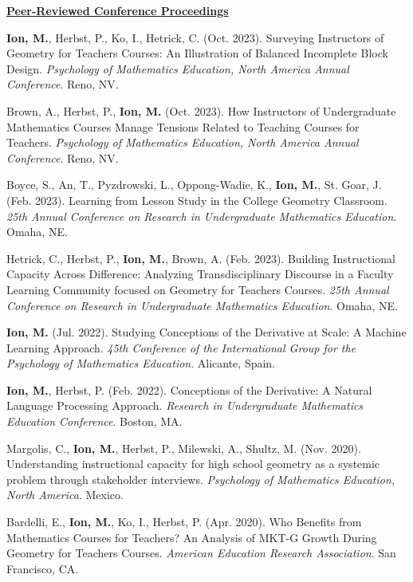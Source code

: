 \documentclass[margin,line]{res}
\newenvironment{list3}{
        \begin{list}{\ding{113}}{%
            \setlength{\itemsep}{0in}
            \setlength{\parsep}{0in} \setlength{\parskip}{0in}
            \setlength{\topsep}{0in} \setlength{\partopsep}{0in}
            \setlength{\leftmargin}{0in}
            \setlength{\rightmargin}{1.25in}}}{\end{list}}
\renewcommand{\subsection}[1]{%
      \par\vspace{3pt}%
      \underline{\normalsize\bfseries #1}%
      \par\vspace{3pt}%
    }
\begin{document}
\begin{resume}
\subsection{\sc Peer-Reviewed Conference Proceedings} 
\begin{list3} 
  \item \textbf{Ion, M.}, Herbst, P., Ko, I., Hetrick, C. (Oct. 2023). Surveying Instructors of Geometry for Teachers Courses: An Illustration of Balanced Incomplete Block Design. \textit{Psychology of Mathematics Education, North America Annual Conference}. Reno, NV. 
  \item Brown, A., Herbst, P., \textbf{Ion, M.} (Oct. 2023). How Instructors of Undergraduate Mathematics Courses Manage Tensions Related to Teaching Courses for Teachers. \textit{Psychology of Mathematics Education, North America Annual Conference}. Reno, NV. 
  \item Boyce, S., An, T., Pyzdrowski, L., Oppong-Wadie, K., \textbf{Ion, M.}, St. Goar, J. (Feb. 2023). Learning from Lesson Study in the College Geometry Classroom. \textit{25th Annual Conference on Research in Undergraduate Mathematics Education}. Omaha, NE.
  \item Hetrick, C., Herbst, P., \textbf{Ion, M.}, Brown, A. (Feb. 2023). Building Instructional Capacity Across Difference: Analyzing Transdisciplinary Discourse in a Faculty Learning Community focused on Geometry for Teachers Courses. \textit{25th Annual Conference on Research in Undergraduate Mathematics Education}. Omaha, NE.
  \item \textbf{Ion, M.} (Jul. 2022). Studying Conceptions of the Derivative at Scale: A Machine Learning Approach. \textit{45th Conference of the International Group for the Psychology of Mathematics Education}. Alicante, Spain. 
  \item \textbf{Ion, M.}, Herbst, P. (Feb. 2022). Conceptions of the Derivative: A Natural Language Processing Approach. \textit{Research in Undergraduate Mathematics Education Conference}. Boston, MA. 
  \item Margolis, C., \textbf{Ion, M.}, Herbst, P., Milewski, A., Shultz, M. (Nov. 2020). Understanding instructional capacity for high school geometry as a systemic problem through stakeholder interviews. \textit{Psychology of Mathematics Education, North America}. Mexico. 
  \item Bardelli, E., \textbf{Ion, M.}, Ko, I., Herbst, P. (Apr. 2020). Who Benefits from Mathematics Courses for Teachers? An Analysis of MKT-G Growth During Geometry for Teachers Courses. \textit{American Education Research Association}. San Francisco, CA. 

\end{list3}
\end{resume}
\end{document}

